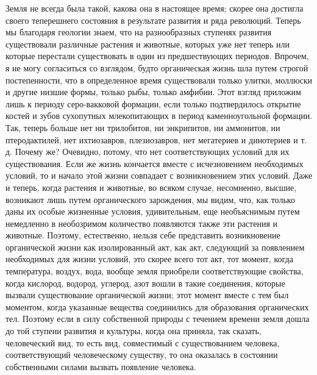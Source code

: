 \documentclass[12pt]{article}
\begin{document}
Земля не всегда была такой, какова она в настоящее время; скорее она достигла своего теперешнего состояния в результате развития и ряда революций. Теперь мы благодаря геологии знаем, что на разнообразных ступенях развития существовали различные растения и животные, которых уже нет теперь или которые перестали существовать в один из предшествующих периодов. Впрочем, я не могу согласиться со взглядом, будто органическая жизнь шла путем строгой постепенности, что в определенное время существовали только улитки, моллюски и другие низшие формы, только рыбы, только амфибии. Этот взгляд приложим лишь к периоду серо-вакковой формации, если только подтвердилось открытие костей и зубов сухопутных млекопитающих в период каменноугольной формации. Так, теперь больше нет ни трилобитов, ни энкрипитов, ни аммонитов, ни птеродактилей, нет ихтиозавров, плезиозавров, нет мегатериев и динотериев и т. д. Почему же? Очевидно, потому, что нет соответствующих условий для их существования. Если же жизнь кончается вместе с исчезновением необходимых условий, то и начало этой жизни совпадает с возникновением этих условий. Даже и теперь, когда растения и животные, во всяком случае, несомненно, высшие, возникают лишь путем органического зарождения, мы видим, что, как только даны их особые жизненные условия, удивительным, еще необъяснимым путем немедленно в необозримом количество появляются также эти растения и животные. Поэтому, естественно, нельзя себе представить возникновение органической жизни как изолированный акт, как акт, следующий за появлением необходимых для жизни условий, это скорее всего тот акт, тот момент, когда температура, воздух, вода, вообще земля приобрели соответствующие свойства, когда кислород, водород, углерод, азот вошли в такие соединения, которые вызвали существование органической жизни; этот момент вместе с тем был моментом, когда указанные вещества соединились для образования органических тел. Поэтому если в силу собственной природы с течением времени земля дошла до той ступени развития и культуры, когда она приняла, так сказать, человеческий вид, то есть вид, совместимый с существованием человека, соответствующий человеческому существу, то она оказалась в состоянии собственными силами вызвать появление человека.



\section{}
\end{document}
